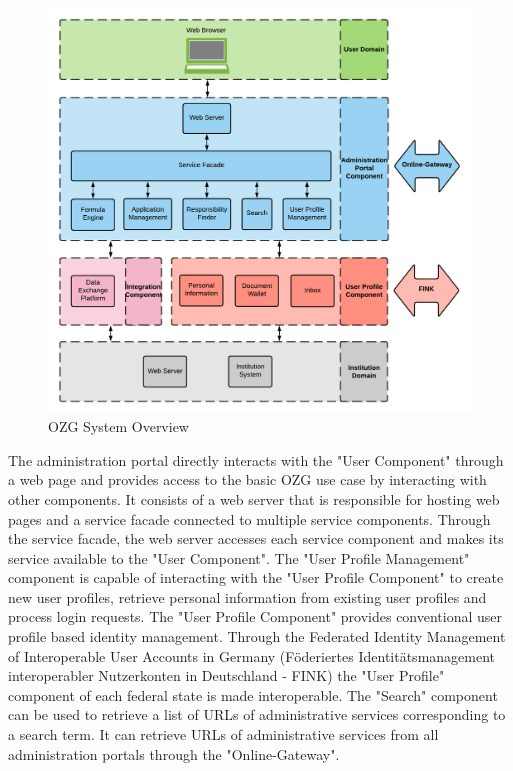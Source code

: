 \begin{figure}[h]
    \centering
    \includegraphics[scale=0.6]{Diagrams/OZG System Overview.pdf}
    \caption{OZG System Overview}
    \label{ozg:system_overview}
\end{figure}

The administration portal directly interacts with the "User Component" through a web page and provides access to the basic OZG use case by interacting with other components. It consists of a web server that is responsible for hosting web pages and a service facade connected to multiple service components. Through the service facade, the web server accesses each service component and makes its service available to the "User Component". 
The "User Profile Management" component is capable of interacting with the "User Profile Component" to create new user profiles, retrieve personal information from existing user profiles and process login requests. 
The "User Profile Component" provides conventional user profile based identity management. 
Through the Federated Identity Management of Interoperable User Accounts in Germany (Föderiertes Identitätsmanagement interoperabler Nutzerkonten in Deutschland - FINK) the "User Profile" component of each federal state is made interoperable. The "Search" component can be used to retrieve a list of URLs of administrative services corresponding to a search term. It can retrieve URLs of administrative services from all administration portals through the "Online-Gateway".

